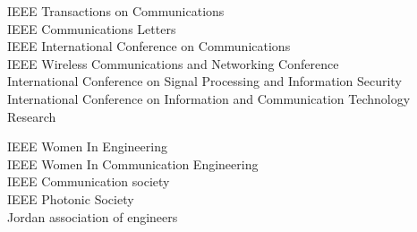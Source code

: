 
\begin{small} \color{black}
 IEEE Transactions on Communications \\
IEEE Communications Letters \\
IEEE International Conference on Communications\\
IEEE Wireless Communications and Networking Conference\\
International Conference on Signal Processing and Information Security\\
 International Conference on Information and Communication Technology Research
\end{small}



\begin{small} \color{black}
IEEE Women In Engineering \\
IEEE  Women In Communication Engineering \\
IEEE Communication society\\
IEEE Photonic Society\\
Jordan association of engineers
\end{small}


